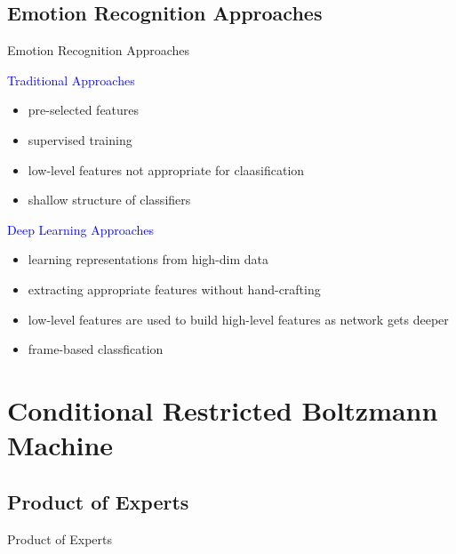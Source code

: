 \subsection{Emotion Recognition Approaches}

\begin{frame}[t]{Emotion Recognition Approaches}
	\begin{minipage}[t]{0.48\linewidth}
	  \textcolor{blue}{\Large Traditional Approaches}
	  \begin{itemize}
	   \item pre-selected features
	   \item supervised training
	   \item low-level features not appropriate for claasification
	   \item shallow structure of classifiers
	  \end{itemize}
	\end{minipage}\hfill
	\begin{minipage}[t]{0.48\linewidth}
	\textcolor{blue}{\Large Deep Learning Approaches}
	  \begin{itemize}
	   \item learning representations from high-dim data
	   \item extracting appropriate features without hand-crafting
	   \item low-level features are used to build high-level features as network gets deeper
	   \item frame-based classfication
	  \end{itemize}

	\end{minipage}

\end{frame}


\section{Conditional Restricted Boltzmann Machine} %


    \subsection{Product of Experts}
	\begin{frame}{Product of Experts}
	 
	\end{frame}


